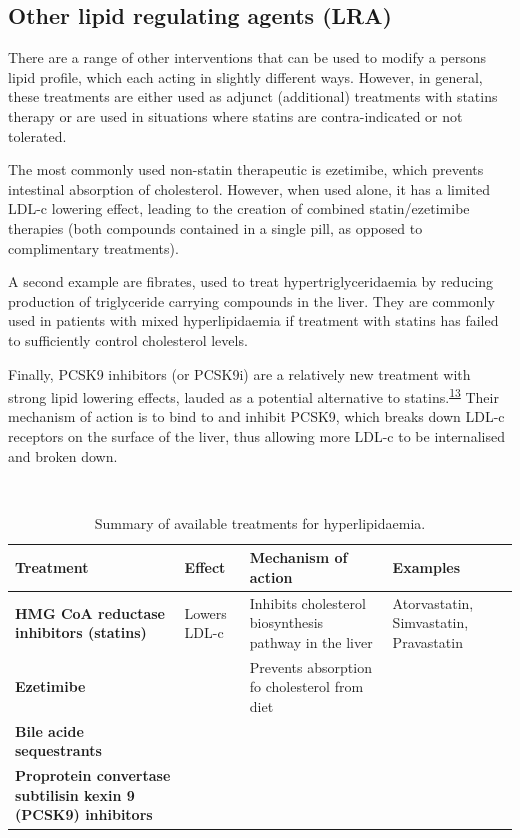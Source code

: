 \documentclass[a4paper, twoside]{templates/ociamthesis}
\begin{document}
\hypertarget{other-lipid-regulating-agents-lra}{%
\subsection{Other lipid regulating agents (LRA)}\label{other-lipid-regulating-agents-lra}}

There are a range of other interventions that can be used to modify a persons lipid profile, which each acting in slightly different ways. However, in general, these treatments are either used as adjunct (additional) treatments with statins therapy or are used in situations where statins are contra-indicated or not tolerated.

The most commonly used non-statin therapeutic is ezetimibe, which prevents intestinal absorption of cholesterol. However, when used alone, it has a limited LDL-c lowering effect, leading to the creation of combined statin/ezetimibe therapies (both compounds contained in a single pill, as opposed to complimentary treatments).

A second example are fibrates, used to treat hypertriglyceridaemia by reducing production of triglyceride carrying compounds in the liver. They are commonly used in patients with mixed hyperlipidaemia if treatment with statins has failed to sufficiently control cholesterol levels.

Finally, PCSK9 inhibitors (or PCSK9i) are a relatively new treatment with strong lipid lowering effects, lauded as a potential alternative to statins.\textsuperscript{\protect\hyperlink{ref-chaudhary2017}{13}} Their mechanism of action is to bind to and inhibit PCSK9, which breaks down LDL-c receptors on the surface of the liver, thus allowing more LDL-c to be internalised and broken down.

~



\begin{table}[!h]

\caption{\label{tab:lipidTreatments-table}Summary of available treatments for hyperlipidaemia.}
\centering
\begin{tabular}[t]{>{\raggedright\arraybackslash}p{8em}>{\raggedright\arraybackslash}p{8em}>{\raggedright\arraybackslash}p{8em}>{\raggedright\arraybackslash}p{8em}}
\toprule
\textbf{Treatment} & \textbf{Effect} & \textbf{Mechanism of action} & \textbf{Examples}\\
\midrule
\textbf{HMG CoA reductase inhibitors (statins)} & Lowers LDL-c & Inhibits cholesterol biosynthesis pathway in the liver & Atorvastatin, Simvastatin, Pravastatin\\
\midrule
\textbf{Ezetimibe} &  & Prevents absorption fo cholesterol from diet & \\
\midrule
\textbf{Bile acide sequestrants} &  &  & \\
\midrule
\textbf{Proprotein convertase subtilisin kexin 9 (PCSK9) inhibitors} &  &  & \\
\bottomrule
\end{tabular}
\end{table}
\end{document}
